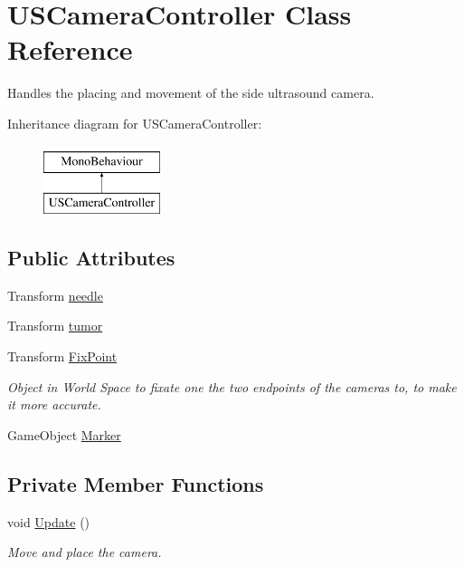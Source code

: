 \hypertarget{class_u_s_camera_controller}{}\section{U\+S\+Camera\+Controller Class Reference}
\label{class_u_s_camera_controller}


Handles the placing and movement of the side ultrasound camera.  


Inheritance diagram for U\+S\+Camera\+Controller\+:\begin{figure}[H]
\begin{center}
\leavevmode
\includegraphics[height=2.000000cm]{class_u_s_camera_controller}
\end{center}
\end{figure}
\subsection*{Public Attributes}
\begin{DoxyCompactItemize}
\item 
Transform \mbox{\hyperlink{class_u_s_camera_controller_af5d70c6e1bfd979cf29077e49196467c}{needle}}
\item 
Transform \mbox{\hyperlink{class_u_s_camera_controller_aa88be26d544017db79b33460b4f4d237}{tumor}}
\item 
\mbox{\label{class_u_s_camera_controller_a3bf8b6ab716db274659db65b21c97826}} 
Transform \mbox{\hyperlink{class_u_s_camera_controller_a3bf8b6ab716db274659db65b21c97826}{Fix\+Point}}
\begin{DoxyCompactList}\small\item\em Object in World Space to fixate one the two endpoints of the cameras to, to make it more accurate. \end{DoxyCompactList}\item 
Game\+Object \mbox{\hyperlink{class_u_s_camera_controller_a0795683be0b0a4c6f0657cee69eaa1e3}{Marker}}
\end{DoxyCompactItemize}
\subsection*{Private Member Functions}
\begin{DoxyCompactItemize}
\item 
void \mbox{\hyperlink{class_u_s_camera_controller_a20fb7ef256409f212446dd6bb7073e7c}{Update}} ()
\begin{DoxyCompactList}\small\item\em Move and place the camera. \end{DoxyCompactList}\end{DoxyCompactItemize}
